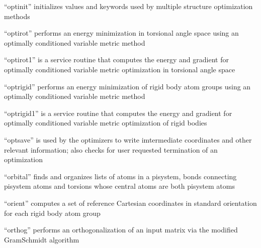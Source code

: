 \documentclass[letterpaper,11pt,english]{sphinxmanual}
\begin{document}
\sphinxAtStartPar
{}

\sphinxAtStartPar
“optinit” initializes values and keywords used by multiple structure optimization methods

\sphinxAtStartPar
{}

\sphinxAtStartPar
“optirot” performs an energy minimization in torsional angle space using an optimally conditioned variable metric method

\sphinxAtStartPar
{}

\sphinxAtStartPar
“optirot1” is a service routine that computes the energy and gradient for optimally conditioned variable metric optimization in torsional angle space

\sphinxAtStartPar
{}

\sphinxAtStartPar
“optrigid” performs an energy minimization of rigid body atom groups using an optimally conditioned variable metric method

\sphinxAtStartPar
{}

\sphinxAtStartPar
“optrigid1” is a service routine that computes the energy and gradient for optimally conditioned variable metric optimization of rigid bodies

\sphinxAtStartPar
{}

\sphinxAtStartPar
“optsave” is used by the optimizers to write imtermediate coordinates and other relevant information; also checks for user requested termination of an optimization

\sphinxAtStartPar
{}

\sphinxAtStartPar
“orbital” finds and organizes lists of atoms in a pisystem, bonds connecting pisystem atoms and torsions whose central atoms are both pisystem atoms

\sphinxAtStartPar
{}

\sphinxAtStartPar
“orient” computes a set of reference Cartesian coordinates in standard orientation for each rigid body atom group

\sphinxAtStartPar
{}

\sphinxAtStartPar
“orthog” performs an orthogonalization of an input matrix via the modified Gram\sphinxhyphen{}Schmidt algorithm

\sphinxAtStartPar
{}
\end{document}
